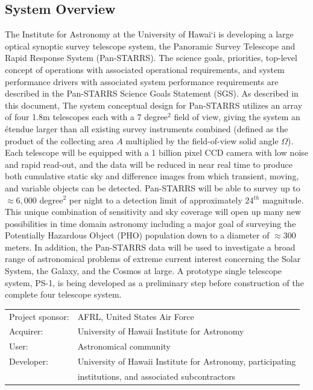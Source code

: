 \documentclass[panstarrs,spec]{panstarrs}
\begin{document}
\subsection{System Overview}

The Institute for Astronomy at the University of Hawai`i is developing
a large optical synoptic survey telescope system, the Panoramic Survey
Telescope and Rapid Response System (Pan-STARRS). The science goals,
priorities, top-level concept of operations with associated
operational requirements, and system performance drivers with
associated system performance requirements are described in the
Pan-STARRS Science Goals Statement (SGS).  As described in this
document, The system conceptual design for Pan-STARRS utilizes an
array of four 1.8m telescopes each with a 7 degree$^2$ field of view,
giving the system an \'etendue larger than all existing survey
instruments combined (defined as the product of the collecting area
$A$ multiplied by the field-of-view solid angle $\Omega$).  Each
telescope will be equipped with a 1 billion pixel CCD camera with low
noise and rapid read-out, and the data will be reduced in near real
time to produce both cumulative static sky and difference images from
which transient, moving, and variable objects can be
detected. Pan-STARRS will be able to survey up to $\approx 6,000$
degree$^{2}$ per night to a detection limit of approximately 24$^{th}$
magnitude.  This unique combination of sensitivity and sky coverage
will open up many new possibilities in time domain astronomy including
a major goal of surveying the Potentially Hazardous Object (PHO)
population down to a diameter of $\approx 300$ meters.  In addition,
the Pan-STARRS data will be used to investigate a broad range of
astronomical problems of extreme current interest concerning the Solar
System, the Galaxy, and the Cosmos at large.  A prototype single
telescope system, PS-1, is being developed as a preliminary step
before construction of the complete four telescope system.

\begin{tabular}{ll}
  Project sponsor:&	AFRL, United States Air Force \\
  Acquirer:       &	University of Hawaii Institute for Astronomy \\
  User: 	  &	Astronomical community \\
  Developer:      &	University of Hawaii Institute for Astronomy, participating \\
  &       institutions, and associated subcontractors	
\end{tabular}
\end{document}
